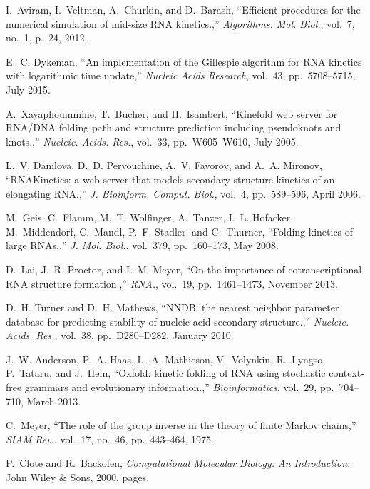 \documentclass[11pt, oneside]{Thesis} %
\begin{document}
\begin{thebibliography}{100}
I.~Aviram, I.~Veltman, A.~Churkin, and D.~Barash, ``Efficient procedures for
  the numerical simulation of mid-size {RNA} kinetics.,'' {\em Algorithms. Mol.
  Biol.}, vol.~7, no.~1, p.~24, 2012.

E.~C. Dykeman, ``{An implementation of the Gillespie algorithm for RNA kinetics
  with logarithmic time update},'' {\em Nucleic Acids Research}, vol.~43,
  pp.~5708--5715, July 2015.

A.~Xayaphoummine, T.~Bucher, and H.~Isambert, ``Kinefold web server for
  {RNA}/{DNA} folding path and structure prediction including pseudoknots and
  knots.,'' {\em Nucleic. Acids. Res.}, vol.~33, pp.~W605--W610, July 2005.

L.~V. Danilova, D.~D. Pervouchine, A.~V. Favorov, and A.~A. Mironov,
  ``{RNAKinetics}: a web server that models secondary structure kinetics of an
  elongating {RNA}.,'' {\em J. Bioinform. Comput. Biol.}, vol.~4, pp.~589--596,
  April 2006.

M.~Geis, C.~Flamm, M.~T. Wolfinger, A.~Tanzer, I.~L. Hofacker, M.~Middendorf,
  C.~Mandl, P.~F. Stadler, and C.~Thurner, ``Folding kinetics of large
  {RNAs}.,'' {\em J. Mol. Biol.}, vol.~379, pp.~160--173, May 2008.

D.~Lai, J.~R. Proctor, and I.~M. Meyer, ``On the importance of
  cotranscriptional {RNA} structure formation.,'' {\em RNA.}, vol.~19,
  pp.~1461--1473, November 2013.

D.~H. Turner and D.~H. Mathews, ``{NNDB}: the nearest neighbor parameter
  database for predicting stability of nucleic acid secondary structure.,''
  {\em Nucleic. Acids. Res.}, vol.~38, pp.~D280--D282, January 2010.

J.~W. Anderson, P.~A. Haas, L.~A. Mathieson, V.~Volynkin, R.~Lyngso, P.~Tataru,
  and J.~Hein, ``Oxfold: kinetic folding of {RNA} using stochastic context-free
  grammars and evolutionary information.,'' {\em Bioinformatics}, vol.~29,
  pp.~704--710, March 2013.

C.~Meyer, ``The role of the group inverse in the theory of finite {M}arkov
  chains,'' {\em SIAM Rev.}, vol.~17, no.~46, pp.~443--464, 1975.

P.~Clote and R.~Backofen, {\em Computational Molecular Biology: An
  Introduction}.
\newblock John Wiley \& Sons, 2000.
 pages.


\end{thebibliography}
\end{document}
